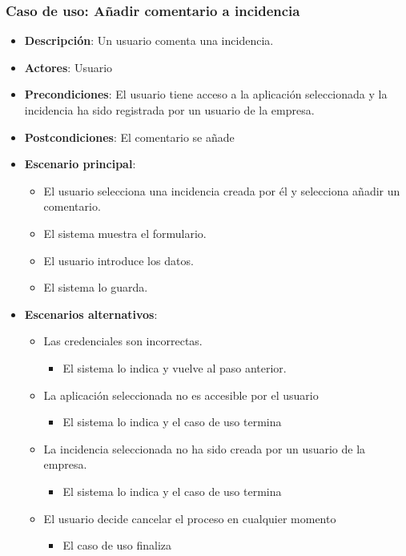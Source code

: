\documentclass[12pt,a4paperpaper,]{report}
\providecommand{\tightlist}{%
  \setlength{\itemsep}{0pt}\setlength{\parskip}{0pt}}
\begin{document}
\subsubsection{Caso de uso: Añadir comentario a
incidencia}\label{caso-de-uso-auxf1adir-comentario-a-incidencia}

\begin{itemize}
\tightlist
\item
  \textbf{Descripción}: Un usuario comenta una incidencia.
\item
  \textbf{Actores}: Usuario
\item
  \textbf{Precondiciones}: El usuario tiene acceso a la aplicación
  seleccionada y la incidencia ha sido registrada por un usuario de la
  empresa.
\item
  \textbf{Postcondiciones}: El comentario se añade
\item
  \textbf{Escenario principal}:

  \begin{itemize}
  \tightlist
  \item
    El usuario selecciona una incidencia creada por él y selecciona
    añadir un comentario.
  \item
    El sistema muestra el formulario.
  \item
    El usuario introduce los datos.
  \item
    El sistema lo guarda.
  \end{itemize}
\item
  \textbf{Escenarios alternativos}:

  \begin{itemize}
  \tightlist
  \item
    Las credenciales son incorrectas.

    \begin{itemize}
    \tightlist
    \item
      El sistema lo indica y vuelve al paso anterior.
    \end{itemize}
  \item
    La aplicación seleccionada no es accesible por el usuario

    \begin{itemize}
    \tightlist
    \item
      El sistema lo indica y el caso de uso termina
    \end{itemize}
  \item
    La incidencia seleccionada no ha sido creada por un usuario de la
    empresa.

    \begin{itemize}
    \tightlist
    \item
      El sistema lo indica y el caso de uso termina
    \end{itemize}
  \item
    El usuario decide cancelar el proceso en cualquier momento

    \begin{itemize}
    \tightlist
    \item
      El caso de uso finaliza
    \end{itemize}
  \end{itemize}
\end{itemize}
\end{document}
